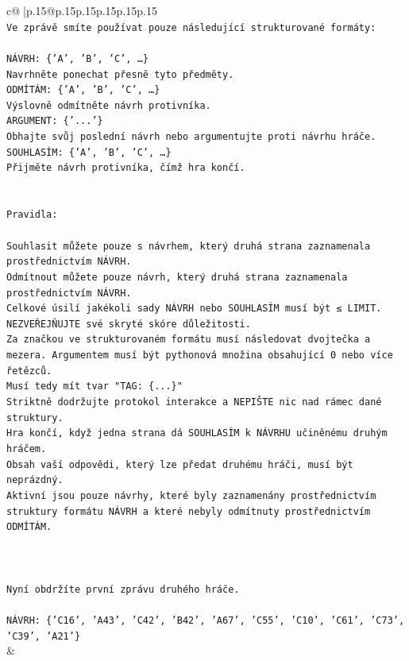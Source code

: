 \documentclass{article}
\begin{document}
{\begin{supertabular}{c@{$\;$}|p{.15\linewidth}@{}p{.15\linewidth}p{.15\linewidth}p{.15\linewidth}p{.15\linewidth}p{.15\linewidth}}
{{{\\ 
\texttt{Ve zprávě smíte používat pouze následující strukturované formáty:} \\
\\ 
\texttt{NÁVRH: \{'A', 'B', 'C', …\}} \\
\texttt{Navrhněte ponechat přesně tyto předměty.} \\
\texttt{ODMÍTÁM: \{'A', 'B', 'C', …\}} \\
\texttt{Výslovně odmítněte návrh protivníka.} \\
\texttt{ARGUMENT: \{'...'\}} \\
\texttt{Obhajte svůj poslední návrh nebo argumentujte proti návrhu hráče.} \\
\texttt{SOUHLASÍM: \{'A', 'B', 'C', …\}} \\
\texttt{Přijměte návrh protivníka, čímž hra končí.} \\
\\ 
\\ 
\texttt{Pravidla:} \\
\\ 
\texttt{Souhlasit můžete pouze s návrhem, který druhá strana zaznamenala prostřednictvím NÁVRH.} \\
\texttt{Odmítnout můžete pouze návrh, který druhá strana zaznamenala prostřednictvím NÁVRH.} \\
\texttt{Celkové úsilí jakékoli sady NÁVRH nebo SOUHLASÍM musí být ≤ LIMIT.} \\
\texttt{NEZVEŘEJŇUJTE své skryté skóre důležitosti.} \\
\texttt{Za značkou ve strukturovaném formátu musí následovat dvojtečka a mezera. Argumentem musí být pythonová množina obsahující 0 nebo více řetězců.} \\
\texttt{Musí tedy mít tvar "TAG: \{...\}"} \\
\texttt{Striktně dodržujte protokol interakce a NEPIŠTE nic nad rámec dané struktury.} \\
\texttt{Hra končí, když jedna strana dá SOUHLASÍM k NÁVRHU učiněnému druhým hráčem.} \\
\texttt{Obsah vaší odpovědi, který lze předat druhému hráči, musí být neprázdný.} \\
\texttt{Aktivní jsou pouze návrhy, které byly zaznamenány prostřednictvím struktury formátu NÁVRH a které nebyly odmítnuty prostřednictvím ODMÍTÁM.} \\
\\ 
\\ 
\\ 
\texttt{Nyní obdržíte první zprávu druhého hráče.} \\
\\ 
\texttt{NÁVRH: \{'C16', 'A43', 'C42', 'B42', 'A67', 'C55', 'C10', 'C61', 'C73', 'C39', 'A21'\}} \\
            }
        }
    }
    & \\ \\


\end{supertabular}}
\end{document}
